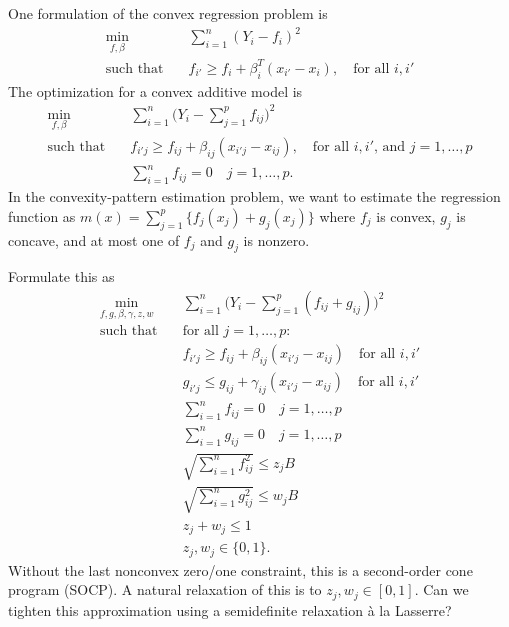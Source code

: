 \documentclass[12pt]{imsart}
\numberwithin{equation}{section}
\theoremstyle{plain}
\theoremstyle{remark}
\begin{document}
\begin{frontmatter}
\end{frontmatter}

\par


One formulation of the convex regression problem is 
\begin{align}
\min_{f,\beta}\quad & \sum_{i=1}^n (Y_i - f_i)^2 \\
\text{such that}\quad & f_{i'} \geq f_i + \beta_i^T(x_{i'}-x_i),
              \quad \text{for all $i,i'$}
\end{align}
The optimization for a convex additive model is
\begin{align}
\min_{f,\beta}\quad & \sum_{i=1}^n \bigl(Y_i - \sum_{j=1}^p f_{ij}\bigr)^2 \\
\text{such that}\quad & f_{i'j} \geq f_{ij} + \beta_{ij}(x_{i'j}-x_{ij}),
              \quad \text{for all $i,i'$, and $j=1,\ldots, p$} \\
  & \sum_{i=1}^n f_{ij} = 0\quad j=1,\ldots, p.
\end{align}
In the convexity-pattern estimation problem, we want to 
estimate the regression function as $m(x) = \sum_{j=1}^p
\bigl\{f_j(x_j) + g_j(x_j)\bigr\}$ where $f_j$ is convex, $g_j$ is concave,
and at most one of $f_j$ and $g_j$ is nonzero.

Formulate this as
\begin{align}
\min_{f,g,\beta,\gamma,z,w}\quad & \sum_{i=1}^n \bigl(Y_i - \sum_{j=1}^p (f_{ij}+g_{ij})\bigr)^2 \\
\text{such that}\quad & \text{for all $j=1,\ldots, p$:} \\
  & f_{i'j} \geq f_{ij} + \beta_{ij}(x_{i'j}-x_{ij}) \quad \text{for all $i,i'$}\\
  & g_{i'j} \leq g_{ij} + \gamma_{ij}(x_{i'j}-x_{ij})\quad \text{for all $i,i'$}\\
  & \sum_{i=1}^n f_{ij} = 0\quad j=1,\ldots, p \\
  & \sum_{i=1}^n g_{ij} = 0\quad j=1,\ldots, p \\
  & \sqrt{\sum_{i=1}^n f_{ij}^2} \leq z_j B \\
  & \sqrt{\sum_{i=1}^n g_{ij}^2} \leq w_j B \\
  & z_j + w_j \leq 1\\
  & z_j, w_j \in \{0,1\}.
\end{align}
Without the last nonconvex zero/one constraint, this is a
second-order cone program (SOCP).  A natural relaxation of this is
to $z_j, w_j \in[0,1]$.  Can we tighten this approximation
using a semidefinite relaxation \`a la Lasserre?
\end{document}
